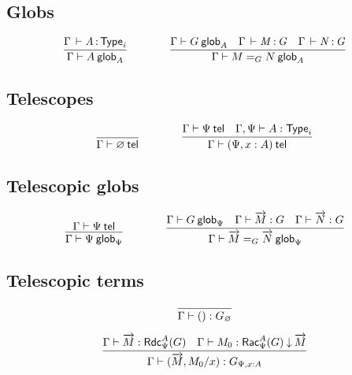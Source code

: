 
\subsection{Globs}


\begin{small}
  \[
  \infer{\wfglob{\Gamma}{A}{A}}
  {\oftp{\Gamma}{A}{\typ{i}}}
  \qquad\qquad
  \infer{\wfglob{\Gamma}{\homj{G}{M}{N}}{A}}
  {\wfglob{\Gamma}{G}{A} &
    \oftp{\Gamma}{M}{G} &
    \oftp{\Gamma}{N}{G}
  }
  \]
\end{small}

\subsection{Telescopes}

\begin{small}
  \[
  \infer{\wftel{\Gamma}{\varnothing}}{}
  \qquad\qquad
  \infer{\wftel{\Gamma}{(\Psi,x:A)}}
  {\wftel{\Gamma}{\Psi}
    & \wftype{\Gamma,\Psi}{A}}
  \]
\end{small}

\subsection{Telescopic globs}

\begin{small}
  \[
  \infer{\wfglob{\Gamma}{\Psi}{\Psi}}
  {\wftel{\Gamma}{\Psi}}
  \qquad\qquad
  \infer{\wfglob{\Gamma}{\homj{G}{\tel{M}}{\tel{N}}}{\Psi}}
  {\wfglob{\Gamma}{G}{\Psi}
    & \ofglob{\Gamma}{\tel{M}}{G}
    & \ofglob{\Gamma}{\tel{N}}{G}}
  \]
\end{small}

\subsection{Telescopic terms}

\begin{small}
  \[
  \infer{\ofglob{\Gamma}{()}{G_\varnothing}}{}
  \]

  \[
  \infer{\ofglob{\Gamma}{(\tel{M},M_0/x)}{G_{\Psi,x:A}}}
  {\ofglob{\Gamma}{\tel M}{\fsttelglob{\Psi}{A}{G}}
    & \ofdepglob{\Gamma}{M_0}{\sndtelglob{\Psi}{A}{G}}{\tel M}}
  \]
\end{small}

